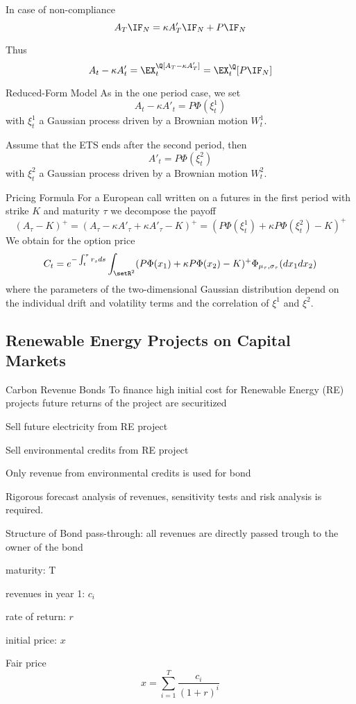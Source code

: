 	In case of non-compliance
		$$
		A_T\IF_{N}= \kappa A'_T \IF_{N} + P\IF_N
		$$
	
	Thus
		$$
		A_t-\kappa A'_t = \EX_t^\Q[A_T-\kappa A'_T]= \EX^\Q_t[P \IF_N]
		$$


Reduced-Form Model
	As in the one period case,  we set
		$$
		A_t-\kappa A'_t = P \Phi(\xi_t^1)
		$$
	with $\xi^1_t$ a Gaussian process driven by a Brownian motion $W^1_t$.
	
	Assume that the ETS ends after the second period, then
		$$
		A'_t = P \Phi(\xi^2_t)
		$$
	with $\xi^2_t$ a Gaussian process driven by a Brownian motion $W^2_t$.


Pricing Formula
	For a European call written on a futures in the first period with strike $K$ and maturity $\tau$ we decompose the payoff
		$$
		(A_\tau-K)^+= (A_\tau - \kappa A'_\tau + \kappa A'_\tau -K )^+= (P\Phi(\xi^1_t) + \kappa P \Phi(\xi_t^2) -K)^+
		$$
	We obtain for the option price
		$$
		C_t = e^{-\int_t^\tau r_s ds} \int_{\setR^2} (P\Phi(x_1)+\kappa P \Phi(x_2) -K)^+ \Phi_{\mu_\tau, \sigma_\tau}(dx_1dx_2)
		$$
	where the parameters of the two-dimensional Gaussian distribution depend on the individual drift and volatility terms and the correlation
	of $\xi^1$ and $\xi^2$.


\subsection{Renewable Energy Projects on Capital Markets}

Carbon Revenue Bonds
	To finance high initial cost for Renewable Energy (RE) projects future returns of the project are securitized

	Sell future electricity from RE project
	
	Sell environmental credits from RE project

	Only revenue from environmental credits is used for bond
	
	Rigorous forecast analysis of revenues, sensitivity tests and risk analysis is required.


Structure of Bond
	pass-through: all revenues are directly passed trough to the owner of the bond

	maturity: T
	
	revenues in year 1: $c_i$
	
	rate of return: $r$
	
	initial price: $x$

	Fair price
		$$
		x= \sum_{i=1}^T \frac{c_i}{(1+r)^i}
		$$


